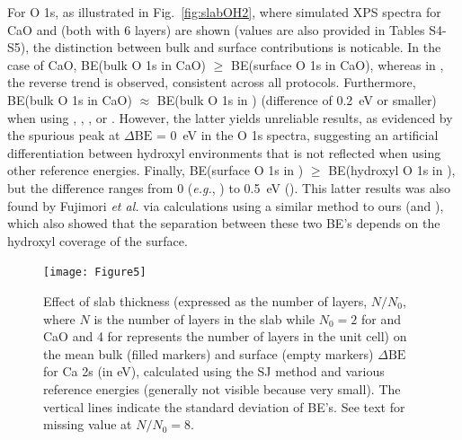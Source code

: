 \documentclass[%
aip,
amsmath,amssymb,
preprint,%
jcp,
showkeys,
]{revtex4-2}
\def\dbe{\ensuremath{\Delta\text{BE}}}
\begin{document}
For O 1s, as illustrated in Fig.~\ref{fig:slabOH2}, where simulated XPS spectra for CaO and  (both with 6 layers) are shown  (values are also provided in Tables S4-S5), the distinction between bulk and surface contributions is noticable. In the case of CaO, BE(bulk O 1s in CaO) $\geq$ BE(surface O 1s in CaO), whereas in , the reverse trend is observed, consistent across all protocols. Furthermore, BE(bulk O 1s in CaO) $\approx$ BE(bulk O 1s in ) (difference of \SI{0.2}{\electronvolt} or smaller) when using , , , or . However, the latter yields unreliable results, as evidenced by the spurious peak at \dbe{} = \SI{0}{\electronvolt} in the O 1s spectra, suggesting an artificial differentiation between hydroxyl environments that is not reflected when using other reference energies. Finally,  BE(surface O 1s in ) $\geq$ BE(hydroxyl O 1s  in ), but the difference ranges from 0 (\textit{e.g.}, ) to \SI{0.5}{\electronvolt} (). This latter results was also found by Fujimori \emph{et al.} \cite{fujimoriInteractionWaterCaO2016a} via calculations using a similar method to ours (and ), which also showed that the separation between these two BE's depends on the hydroxyl coverage of the surface.



\begin{figure}[p]
	\centering
	\texttt{[image: Figure5]}
	\caption{Effect of slab thickness (expressed as the number of layers, $N/N_0$, where $N$ is the number of layers in the slab while $N_0 = 2$ for  and CaO and 4 for  represents the number of layers in the unit cell)  on the mean bulk (filled markers) and surface (empty markers) \dbe{} for Ca 2s (in \si{\electronvolt}), calculated using the SJ method and various reference energies  (generally not visible because very small). The vertical lines indicate the standard deviation of BE's. See text for missing value at $N/N_0=8$.}
	\label{fig:slabsthicknessSJ}
\end{figure}
\end{document}
